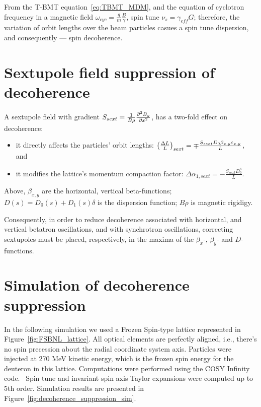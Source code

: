 \documentclass[a4paper]{jacow}
\newcommand{\w}{\omega}
\begin{document}
From the T-BMT equation~\eqref{eq:TBMT_MDM}, and the equation of cyclotron frequency in a magnetic field $\w_{cyc} = \frac qm \frac B\gamma$, spin tune $\nu_s = \gamma_{eff}G$; therefore, the variation of orbit lengths over the beam particles casues a spin tune dispersion, and consequently --- spin decoherence.

\section{Sextupole field suppression of decoherence}
A sextupole field with gradient $ S_{sext} = \frac{1}{B\rho} \pddx{B_y}[x][2]$, has a two-fold effect on decoherence:
\begin{itemize}
\item it directly affects the particles' orbit lengths: $\bkt{\frac{\Delta L}{L}}_{sext} = \mp \frac{S_{sext}D_0\beta_{x,y}\varepsilon_{x,y}}{L}$, and
\item it modifies the lattice's momentum compaction factor: $\Delta \alpha_{1,sext} = -\frac{S_{sext}D_0^3}{L}$.
\end{itemize}
Above, $\beta_{x,y}$ are the horizontal, vertical beta-functions; $D(s) = D_0(s) + D_1(s)\delta$ is the dispersion function; $B\rho$ is magnetic rigidigy.

Consequently, in order to reduce decoherence associated with horizontal, and vertical betatron oscillations, and with synchrotron oscillations, correcting sextupoles must be placed, respectively, in the maxima of the $\beta_x$-, $\beta_y$- and $D$-functions.
\section{Simulation of decoherence suppression}
In the following simulation we used a Frozen Spin-type lattice represented in Figure~\ref{fig:FSBNL_lattice}. All optical elements are perfectly aligned, i.e., there's no spin precession about the radial coordinate system axis. Particles were injected at 270 MeV kinetic energy, which is the frozen spin energy for the deuteron in this lattice. Computations were performed using the COSY Infinity code.~\cite{COSY:Website} Spin tune and invariant spin axis Taylor expansions were computed up to 5th order. Simulation results are presented in Figure~\ref{fig:decoherence_suppression_sim}.
\end{document}
